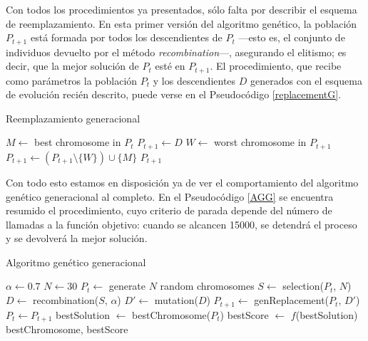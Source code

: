 \documentclass[a4paper, 11pt, titlepage]{article}
\begin{document}
    Con todos los procedimientos ya presentados, sólo falta por describir el esquema de reemplazamiento. En esta primer versión del algoritmo genético, la población $P_{t+1}$ está formada por todos los descendientes de $P_t$ ---esto es, el conjunto de individuos devuelto por el método \emph{recombination}---, asegurando el elitismo; es decir, que la mejor solución de $P_t$ esté en $P_{t+1}$. El procedimiento, que recibe como parámetros la población $P_t$ y los descendientes $D$ generados con el esquema de evolución recién descrito, puede verse en el Pseudocódigo \ref{replacementG}.

    \begin{algorithm}
        \caption{Reemplazamiento generacional}\label{replacementG}
        \begin{algorithmic}[1]
             
            \State $M \gets$ best chromosome in $P_t$
            \State $P_{t+1} \gets D$
                \State $W \gets$ worst chromosome in $P_{t+1}$
                \State $P_{t+1} \gets (P_{t+1} \setminus \{W\}) \cup \{M\}$
            \EndIf
            \State \Return $P_{t+1}$
            \EndFunction
        \end{algorithmic}
    \end{algorithm}

    Con todo esto estamos en disposición ya de ver el comportamiento del algoritmo genético generacional al completo. En el Pseudocódigo \ref{AGG} se encuentra resumido el procedimiento, cuyo criterio de parada depende del número de llamadas a la función objetivo: cuando se alcancen 15000, se detendrá el proceso y se devolverá la mejor solución.

    \begin{algorithm}
        \caption{Algoritmo genético generacional}\label{AGG}
        \begin{algorithmic}[1]
            \State $\alpha \gets 0.7$ 
            \State $N \gets 30$ 
            \State $P_t \gets$ generate $N$ random chromosomes
                \State $S \gets$ selection($P_t$, $N$) 
                \State $D \gets$ recombination($S$, $\alpha$)
                \State $D' \gets$ mutation($D$)
                \State $P_{t+1} \gets$ genReplacement($P_t$, $D'$)
                \State $P_t \gets P_{t+1}$
            \EndWhile
            \State bestSolution $\gets$ bestChromosome($P_t$)
            \State bestScore $\gets$ $f$(bestSolution)
            \State \Return bestChromosome, bestScore
            \EndFunction
        \end{algorithmic}
    \end{algorithm}
\end{document}
